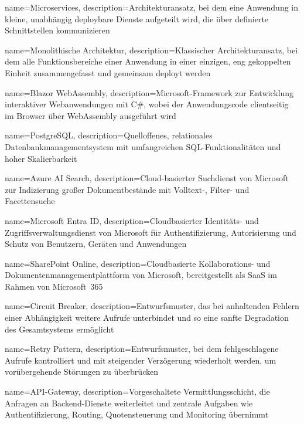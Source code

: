 {
    name=Microservices,
    description={Architekturansatz, bei dem eine Anwendung in kleine, unabhängig deploybare Dienste aufgeteilt wird, die über definierte Schnittstellen kommunizieren}
}

{
    name=Monolithische Architektur,
    description={Klassischer Architekturansatz, bei dem alle Funktionsbereiche einer Anwendung in einer einzigen, eng gekoppelten Einheit zusammengefasst und gemeinsam deployt werden}
}

{
    name=Blazor WebAssembly,
    description={Microsoft-Framework zur Entwicklung interaktiver Webanwendungen mit C\#, wobei der Anwendungscode clientseitig im Browser über WebAssembly ausgeführt wird}
}

{
    name=PostgreSQL,
    description={Quelloffenes, relationales Datenbankmanagementsystem mit umfangreichen SQL-Funktionalitäten und hoher Skalierbarkeit}
}

{
    name=Azure AI Search,
    description={Cloud-basierter Suchdienst von Microsoft zur Indizierung großer Dokumentbestände mit Volltext-, Filter- und Facettensuche}
}

{
    name=Microsoft Entra ID,
    description={Cloudbasierter Identitäts- und Zugriffsverwaltungsdienst von Microsoft für Authentifizierung, Autorisierung und Schutz von Benutzern, Geräten und Anwendungen}
}

{
    name=SharePoint Online,
    description={Cloudbasierte Kollaborations- und Dokumentenmanagementplattform von Microsoft, bereitgestellt als SaaS im Rahmen von Microsoft~365}
}

{
    name=Circuit Breaker,
    description={Entwurfsmuster, das bei anhaltenden Fehlern einer Abhängigkeit weitere Aufrufe unterbindet und so eine sanfte Degradation des Gesamtsystems ermöglicht}
}

{
    name=Retry Pattern,
    description={Entwurfsmuster, bei dem fehlgeschlagene Aufrufe kontrolliert und mit steigender Verzögerung wiederholt werden, um vorübergehende Störungen zu überbrücken}
}

{
    name=API-Gateway,
    description={Vorgeschaltete Vermittlungsschicht, die Anfragen an Backend-Dienste weiterleitet und zentrale Aufgaben wie Authentifizierung, Routing, Quotensteuerung und Monitoring übernimmt}
}

